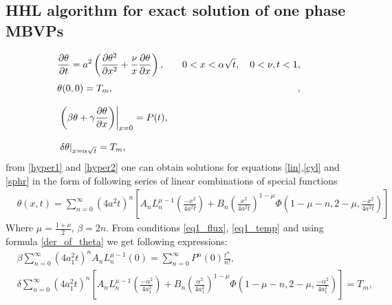 \documentclass[review]{elsarticle}
\begin{document}
\subsection{HHL algorithm for exact solution of one phase MBVPs}
\label{sec:onephase}
\begin{align}
&\frac{\partial {\theta}}{\partial {t}} = a^2\left(\frac{\partial {\theta^2}}{\partial {x^2}} + \frac{\nu}{x}\frac{\partial{\theta}}{\partial{x}} \right),\hspace{1em}  &0<x<\alpha\sqrt{t},\hspace{1em} 0<\nu, t<1, \label{gen_rob}\\[1mm]
&\theta(0,0) = T_{m},&\hspace{1mm},\label{eq1_incond1}\\[3mm]
&\left. \left(\beta \theta+\gamma \frac{\partial \theta}{\partial x} \right)\right|_{x=0 }= P(t),\label{eq1_flux}\\[3mm]
&\left. \delta \theta \right|_{x=\alpha \sqrt{t} } = T_{m},  \label{eq1_temp}
\end{align}
from \ref{hyper1} and \ref{hyper2} one can obtain solutions for equations \ref{lin},\ref{cyl} and \ref{sphr} in the form of following series of linear combinations of special functions
\begin{align}
&\theta(x,t)= \sum_{n=0}^{\infty}\left(4a^2t\right)^{n}\left[A_nL_{n}^{\mu-1}\left( \frac{-x^2}{4a^2t} \right)+ B_n\left( \frac{x^2}{4a^2t} \right)^{1-\mu}\Phi\left(1-\mu-n, 2-\mu,\frac{-x^2}{4a^2t}\right)\right] \label{soleq1}
\end{align}
Where $\mu = \frac{1+\nu}{2}$, $\beta=2n$.
From conditions \ref{eq1_flux}, \ref{eq1_temp} and using formula \ref{der_of_theta} we get following expressions:
\begin{align}
&\beta\sum_{n=0}^\infty\left(4a_1^2t\right)^nA_nL_n^{\mu-1}(0)=\sum_{n=0}^\infty P^n(0)\frac{t^n}{n!},
\label{eq1_sys1}\\
&\delta\sum_{n=0}^{\infty}\left(4a_{1}^2t\right)^{n}\left[A_nL_{n}^{\mu-1}\left( \frac{-\alpha^2}{4a_{1}^2} \right)+ B_n\left( \frac{\alpha^2}{4a_{1}^2} \right)^{1-\mu}\Phi\left(1-\mu-n, 2-\mu,\frac{-\alpha^2}{4a_{1}^2}\right)\right]=T_m,\nonumber\\
\label{eq1_sys2}
\end{align}
\end{document}
